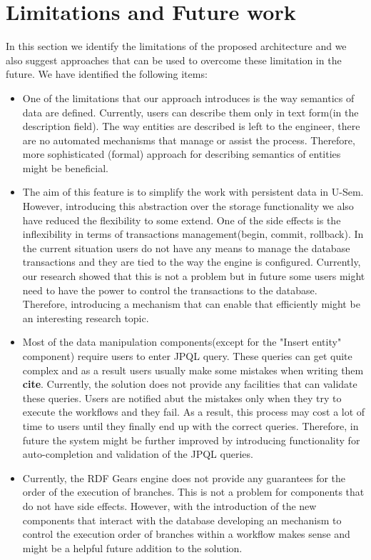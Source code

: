 \section{Limitations and Future work}

In this section we identify the limitations of the proposed architecture and we also suggest approaches that can be used to overcome these limitation in the future. We have identified the following items:

\begin{itemize}
\item One of the limitations that our approach introduces is the way semantics of data are defined. Currently, users can describe them only in text form(in the description field). The way entities are described is left to the engineer, there are no automated mechanisms that manage or assist the process. Therefore, more sophisticated (formal) approach for describing semantics of entities might be beneficial.

\item The aim of this feature is to simplify the work with persistent data in U-Sem. However, introducing this abstraction over the storage functionality we also have reduced the flexibility to some extend. One of the side effects is the inflexibility in terms of transactions management(begin, commit, rollback). In the current situation users do not have any means to manage the database transactions and they are tied to the way the engine is configured. Currently, our research showed that this is not a problem but in future some users might need to have the power to control the transactions to the database. Therefore, introducing a mechanism that can enable that efficiently might be an interesting research topic.

\item Most of the data manipulation components(except for the "Insert entity" component) require users to enter JPQL query. These queries can get quite complex and as a result users usually make some mistakes when writing them \textbf{cite}. Currently, the solution does not provide any facilities that can validate these queries. Users are notified abut the mistakes only when they try to execute the workflows and they fail. As a result, this process may cost a lot of time to users until they finally end up with the correct queries. Therefore, in future the system might be further improved by introducing functionality for auto-completion and validation of the JPQL queries.

\item Currently, the RDF Gears engine does not provide any guarantees for the order of the execution of branches. This is not a problem for components that do not have side effects. However, with the introduction of the new components that interact with the database developing an mechanism to control the execution order of branches within a workflow makes sense and might be a helpful future addition to the solution.


\end{itemize}
